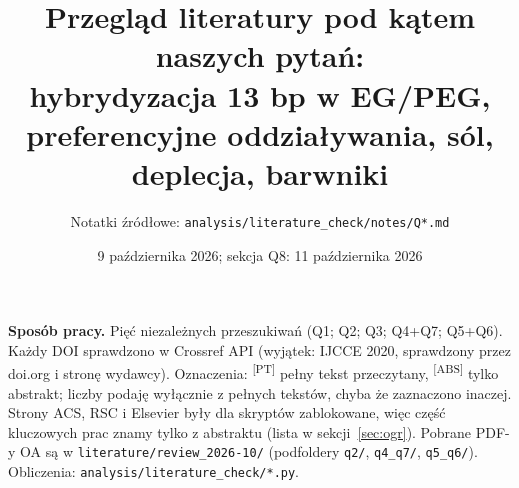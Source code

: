 \documentclass[10pt,a4paper]{article}
\title{Przegląd literatury pod kątem naszych pytań:\\
\large hybrydyzacja 13 bp w EG/PEG, preferencyjne oddziaływania, sól, deplecja, barwniki}
\author{Notatki źródłowe: \texttt{analysis/literature\_check/notes/Q*.md}}
\date{9 października 2026; sekcja Q8: 11 października 2026}
\newcommand{\PT}{\textsuperscript{[PT]}}
\newcommand{\ABS}{\textsuperscript{[ABS]}}
\begin{document}
\maketitle
\vspace{-1.6em}

\textbf{Sposób pracy.} Pięć niezależnych przeszukiwań (Q1; Q2; Q3; Q4+Q7; Q5+Q6). Każdy DOI sprawdzono w Crossref API (wyjątek: IJCCE 2020, sprawdzony przez doi.org i stronę wydawcy). Oznaczenia: \PT{} pełny tekst przeczytany, \ABS{} tylko abstrakt; liczby podaję wyłącznie z pełnych tekstów, chyba że zaznaczono inaczej. Strony ACS, RSC i Elsevier były dla skryptów zablokowane, więc część kluczowych prac znamy tylko z abstraktu (lista w sekcji~\ref{sec:ogr}). Pobrane PDF-y OA są w \texttt{literature/review\_2026-10/} (podfoldery \texttt{q2/}, \texttt{q4\_q7/}, \texttt{q5\_q6/}). Obliczenia: \texttt{analysis/literature\_check/*.py}.
\end{document}
